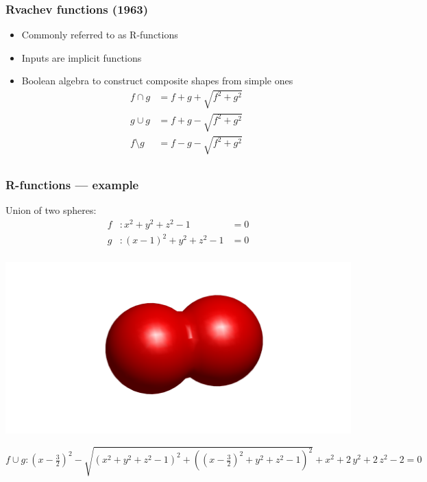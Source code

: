 \documentclass{beamer}
\begin{document}
\begin{frame}[t] 
\frametitle{Rvachev functions (1963)} 
\begin{itemize} 
\item Commonly referred to as R-functions 
\item Inputs are implicit functions
\item Boolean algebra to construct composite shapes from simple ones 
\[
    \begin{aligned}
    f \cap g &= f + g + \sqrt{f^2 + g^2}       \\ 
    g \cup g &= f + g - \sqrt{f^2 + g^2}       \\
    f \setminus g &= f - g - \sqrt{f^2 + g^2}  \\
    \end{aligned}
\]
\end{itemize} 
\end{frame}
\begin{frame}[t] 
\frametitle{R-functions --- example} 
Union of two spheres:
\[
   \begin{aligned}
   f&: x^2+y^2+z^2 - 1 &= 0 \\
   g&: (x-1)^2+y^2+z^2 - 1 &= 0 \\
   \end{aligned}
\]


\begin{center}
{\tiny
\centerline{\includegraphics[width = 0.75\linewidth]{./figs/TwoSpheres}} 
\vspace{-3mm}
$
f \cup g: {\left(x-\frac{3}{2}\right)}^2-\sqrt{{\left(x^2+y^2+z^2-1\right)}^2+{\left({\left(x-\frac{3}{2}\right)}^2+y^2+z^2-1\right)}^2}+x^2+2\,y^2+2\,z^2-2 = 0$ 
}
\end{center}
\end{frame} 
\end{document}
